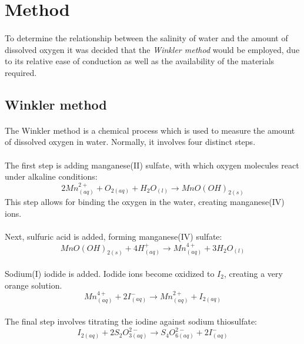 \documentclass[a4paper]{article}
\begin{document}
\section{Method}

\paragraph*{}
To determine the relationship between the salinity of water and the amount of
dissolved oxygen it was decided that the \textit{Winkler method} would be
employed, due to its relative ease of conduction as well as the availability of
the materials required.

\subsection{Winkler method}

\paragraph*{}
The Winkler method is a chemical process which is used to measure the amount of
dissolved oxygen in water. Normally, it involves four distinct steps.

\paragraph*{}
The first step is adding manganese(II) sulfate, with which oxygen molecules
react under alkaline conditions:
$$2 Mn^{2+}_{(aq)} + O_{2(aq)} + H_2O_{(l)} \rightarrow MnO(OH)_{2(s)}$$
This step allows for binding the oxygen in the water, creating manganese(IV)
ions.

\paragraph*{}
Next, sulfuric acid is added, forming manganese(IV) sulfate:
$$MnO(OH)_{2(s)} + 4H^+_{(aq)} \rightarrow Mn^{4+}_{(aq)} + 3H_2O_{(l)}$$

\paragraph*{}
Sodium(I) iodide is added. Iodide ions become oxidized to $I_2$, creating a
very orange solution.
$$Mn^{4+}_{(aq)} + 2I^-_{(aq)} \rightarrow Mn^{2+}_{(aq)} + I_{2(aq)}$$

\paragraph*{}
The final step involves titrating the iodine against sodium thiosulfate:
$$I_{2(aq)} + 2S_2O_{3(aq)}^{2-} \rightarrow S_4O_{6(aq)}^{2-} + 2I_{(aq)}^-$$
\end{document}
